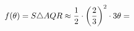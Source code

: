 \documentclass[preview]{standalone}
\begin{document}
\begin{align*}
f( \theta ) = S \triangle AQR \approx {1 \over 2} \cdot \left( {2 \over 3} \right) ^2 \cdot 3 \theta =
\end{align*}
\end{document}

